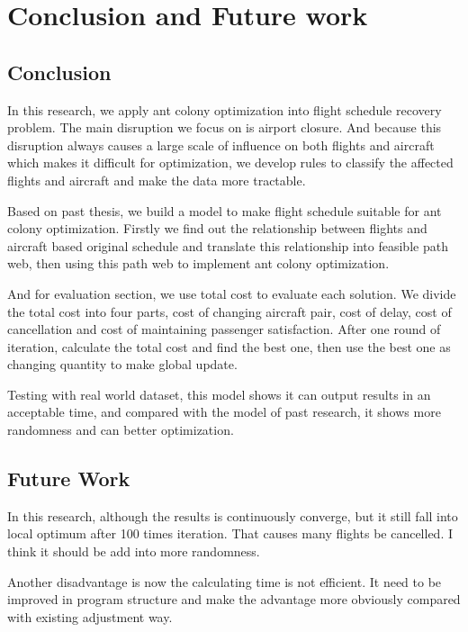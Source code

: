 \documentclass[senior]{IPSstyle}
\begin{document}
\chapter{Conclusion and Future work} \label{Future work}

\section{Conclusion}
In this research, we apply ant colony optimization into flight schedule recovery problem. The main disruption we focus on is airport closure. And because this disruption always causes a large scale of influence on both flights and aircraft which makes it difficult for optimization, we develop rules to classify the affected flights and aircraft and make the data more tractable.

Based on past thesis\cite{sousa2015airline}, we build a model to make flight schedule suitable for ant colony optimization. Firstly we find out the relationship between flights and aircraft based original schedule and translate this relationship into feasible path web, then using this path web to implement ant colony optimization.

And for evaluation section, we use total cost to evaluate each solution. We divide the total cost into four parts, cost of changing aircraft pair, cost of delay, cost of cancellation and cost of maintaining passenger satisfaction. After one round of iteration, calculate the total cost and find the best one, then use the best one as changing quantity to make global update. 

Testing with real world dataset, this model shows it can output results in an acceptable time, and compared with the model of past research\cite{sousa2015airline}, it shows more randomness and can better optimization.

\section{Future Work}
In this research, although the results is continuously converge, but it still fall into local optimum after 100 times iteration. That causes many flights be cancelled. I think it should be add into more randomness.

Another disadvantage is now the calculating time is not efficient. It need to be improved in program structure and make the advantage more obviously compared with existing adjustment way.  




\end{document}
